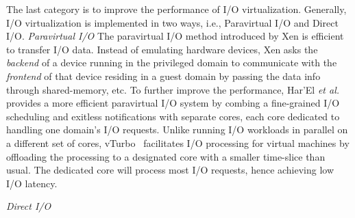  The last category is to improve the performance of I/O virtualization. Generally, I/O virtualization is implemented in two ways, i.e., Paravirtual I/O and Direct I/O.
\emph{Paravirtual I/O} The paravirtual I/O method introduced by Xen is efficient to transfer I/O data. Instead of emulating hardware devices, Xen asks the \emph{backend} of a device running in the privileged domain to communicate with the \emph{frontend} of that device residing in a guest domain by passing the data info through shared-memory, etc. To further improve the performance, Har'El \emph{et al.}~\cite{har2013efficient} provides a more efficient paravirtual I/O system by combing a fine-grained I/O scheduling and exitless notifications with separate cores, each core dedicated to handling one domain's I/O requests. Unlike running I/O workloads in parallel on a different set of cores, vTurbo~\cite{xu2013vturbo} facilitates I/O processing for virtual machines by offloading the processing to a designated core with a smaller time-slice than usual. The dedicated core will process most I/O requests, hence achieving low I/O latency.
 
\emph{Direct I/O} 

